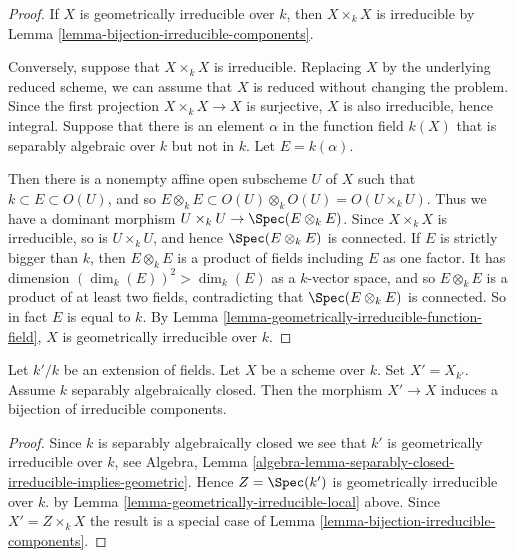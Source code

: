 \begin{proof}
If $X$ is geometrically irreducible over $k$,
then $X\times_k X$ is irreducible
by Lemma \ref{lemma-bijection-irreducible-components}.

\medskip\noindent
Conversely, suppose that $X \times_k X$ is irreducible. Replacing $X$
by the underlying reduced scheme, we can assume that $X$ is reduced
without changing the problem.
Since the first projection $X \times_k X \to X$
is surjective, $X$ is also irreducible, hence integral.
Suppose that there is an element
$\alpha$ in the function field $k(X)$ that is separably
algebraic over $k$ but not in $k$. Let $E = k(\alpha)$.

\medskip\noindent
Then there is a nonempty affine open subscheme $U$ of $X$ such that
$k \subset E \subset O(U)$, and so $E \otimes_k E \subset
O(U)\otimes_k O(U) = O(U\times_k U)$. Thus we have a dominant morphism
$U \times_k U \to \Spec(E\otimes_k E)$. Since $X\times_k X$ is irreducible,
so is $U \times_k U$, and hence $\Spec(E \otimes_k E)$ is connected.
If $E$ is strictly bigger than $k$, then $E \otimes_k E$
is a product of fields including $E$ as one factor. It has dimension
$(\dim_k(E))^2>\dim_k(E)$ as a $k$-vector space,
and so $E\otimes_k E$ is a product
of at least two fields, contradicting that $\Spec(E \otimes_k E)$
is connected. So in fact $E$ is equal to $k$.
By Lemma \ref{lemma-geometrically-irreducible-function-field},
$X$ is geometrically irreducible over $k$.
\end{proof}

\begin{lemma}
\label{lemma-separably-closed-field-irreducible-components}
Let $k'/k$ be an extension of fields.
Let $X$ be a scheme over $k$. Set $X' = X_{k'}$.
Assume $k$ separably algebraically closed.
Then the morphism $X' \to X$ induces a bijection of irreducible components.
\end{lemma}

\begin{proof}
Since $k$ is separably algebraically closed we see that
$k'$ is geometrically irreducible over $k$, see Algebra,
Lemma \ref{algebra-lemma-separably-closed-irreducible-implies-geometric}.
Hence $Z = \Spec(k')$ is geometrically irreducible over $k$.
by Lemma \ref{lemma-geometrically-irreducible-local} above.
Since $X' = Z \times_k X$ the result is a special case
of Lemma \ref{lemma-bijection-irreducible-components}.
\end{proof}

